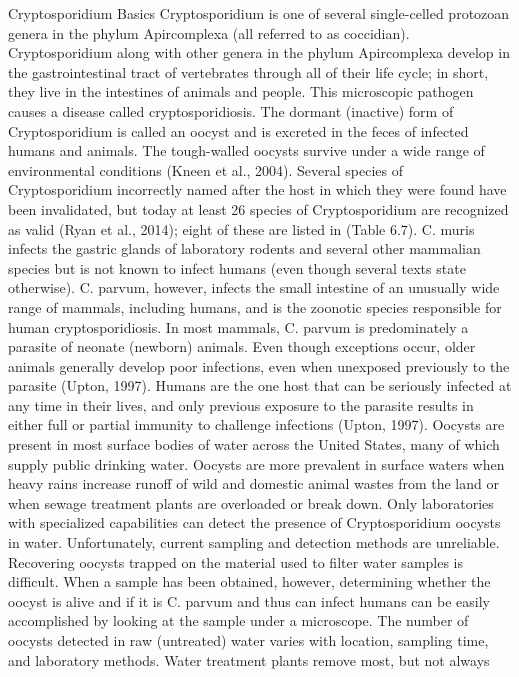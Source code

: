 \documentclass{article}
\begin{document}
Cryptosporidium Basics Cryptosporidium is one of several single-celled
protozoan genera in the phylum Apircomplexa (all referred to as
coccidian). Cryptosporidium along with other genera in the phylum
Apircomplexa develop in the gastrointestinal tract of vertebrates
through all of their life cycle; in short, they live in the intestines
of animals and people. This microscopic pathogen causes a disease called
cryptosporidiosis. The dormant (inactive) form of Cryptosporidium is
called an oocyst and is excreted in the feces of infected humans and
animals. The tough-walled oocysts survive under a wide range of
environmental conditions (Kneen et al., 2004). Several species of
Cryptosporidium incorrectly named after the host in which they were
found have been invalidated, but today at least 26 species of
Cryptosporidium are recognized as valid (Ryan et al., 2014); eight of
these are listed in (Table 6.7). C. muris infects the gastric glands of
laboratory rodents and several other mammalian species but is not known
to infect humans (even though several texts state otherwise). C. parvum,
however, infects the small intestine of an unusually wide range of
mammals, including humans, and is the zoonotic species responsible for
human cryptosporidiosis. In most mammals, C. parvum is predominately a
parasite of neonate (newborn) animals. Even though exceptions occur,
older animals generally develop poor infections, even when unexposed
previously to the parasite (Upton, 1997). Humans are the one host that
can be seriously infected at any time in their lives, and only previous
exposure to the parasite results in either full or partial immunity to
challenge infections (Upton, 1997). Oocysts are present in most surface
bodies of water across the United States, many of which supply public
drinking water. Oocysts are more prevalent in surface waters when heavy
rains increase runoff of wild and domestic animal wastes from the land
or when sewage treatment plants are overloaded or break down. Only
laboratories with specialized capabilities can detect the presence of
Cryptosporidium oocysts in water. Unfortunately, current sampling and
detection methods are unreliable. Recovering oocysts trapped on the
material used to filter water samples is difficult. When a sample has
been obtained, however, determining whether the oocyst is alive and if
it is C. parvum and thus can infect humans can be easily accomplished by
looking at the sample under a microscope. The number of oocysts detected
in raw (untreated) water varies with location, sampling time, and
laboratory methods. Water treatment plants remove most, but not always
\end{document}
